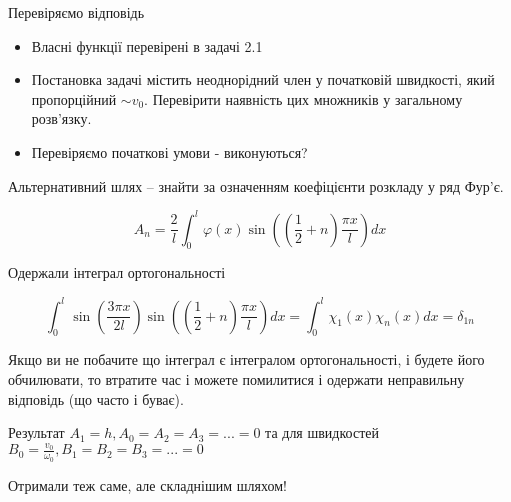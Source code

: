 Перевіряємо відповідь

\begin{itemize}
    \item Власні функції перевірені в задачі 2.1
    \item Постановка задачі містить неоднорідний член у початковій швидкості, який пропорційний $\sim v_0$. Перевірити наявність цих множників у загальному розв'язку.
    \item Перевіряємо початкові умови - виконуються?

\end{itemize}

Альтернативний шлях -- знайти за означенням коефіцієнти розкладу у ряд Фур'є.

\begin{equation}
    A_n = \frac{2}{l} \int_{0}^{l} \varphi (x)  \sin \left( (\frac{1}{2} + n) \frac{\pi x}{l} \right) dx    
\end{equation}

Одержали інтеграл ортогональності 

\begin{equation}
    \int^{l}_0 \sin \left( \frac{3 \pi x}{2 l} \right) \sin \left( (\frac{1}{2} + n) \frac{\pi x}{l} \right) dx = \int^{l}_0 \chi_1 (x) \chi_n (x) dx = \delta_{1n}
\end{equation}

Якщо ви не побачите що інтеграл є інтегралом ортогональності, і будете його обчилювати, то втратите час і можете помилитися і одержати неправильну відповідь (що часто і буває).

Результат $A_1 = h, A_0 = A_2 = A_3 = ... = 0$ та для швидкостей $B_0 = \frac{v_0}{\omega_0}, B_1 = B_2 = B_3 = ... = 0$

Отримали теж саме, але складнішим шляхом!

%
